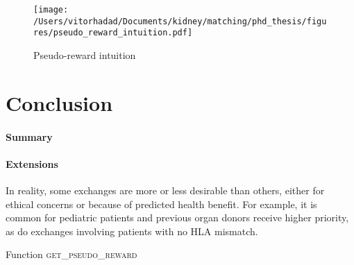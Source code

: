 \documentclass[format=acmsmall, review=false]{acmart}
\begin{document}
\begin{figure}[htbp]
\centering
\texttt{[image: /Users/vitorhadad/Documents/kidney/matching/phd\_thesis/figures/pseudo\_reward\_intuition.pdf]}
\caption{Pseudo-reward intuition}
\label{fig:pseudo_reward_intuition}
\end{figure}


\section{Conclusion}

\paragraph{Summary}

\paragraph{Extensions} In reality, some exchanges are more or less desirable than others, either for ethical concerns or because of predicted health benefit. For example, it is common for pediatric patients and previous organ donors receive higher priority, as do exchanges involving patients with no HLA mismatch. 


\begin{algorithm}[htbp]
	\SetAlgoLined
  \DontPrintSemicolon
	\caption{Function \textsc{get\_pseudo\_reward}}
	\label{alg:get_pseudo_reward}
\end{algorithm}
\end{document}
